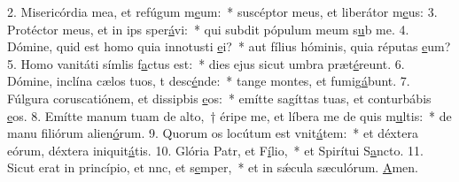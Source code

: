 2. Misericórdia mea, et refúgum m\uline{e}um:~* suscéptor meus, et liberátor m\uline{e}us:
3. Protéctor meus, et in ips sper\uline{á}vi:~* qui subdit pópulum meum s\uline{u}b me.
4. Dómine, quid est homo quia innotusti \uline{e}i?~* aut fílius hóminis, quia réputas \uline{e}um?
5. Homo vanitáti símlis f\uline{a}ctus est:~* dies ejus sicut umbra præt\uline{é}reunt.
6. Dómine, inclína cælos tuos, t desc\uline{é}nde:~* tange montes, et fumig\uline{á}bunt.
7. Fúlgura coruscatiónem, et dissipbis \uline{e}os:~* emítte sagíttas tuas, et conturbábis \uline{e}os.
8. Emítte manum tuam de alto,~† éripe me, et líbera me de quis m\uline{u}ltis:~* de manu filiórum alien\uline{ó}rum.
9. Quorum os locútum est vnit\uline{á}tem:~* et déxtera eórum, déxtera iniquit\uline{á}tis.
10. Glória Patr, et F\uline{í}lio,~* et Spirítui S\uline{a}ncto.
11. Sicut erat in princípio, et nnc, et s\uline{e}mper,~* et in sǽcula sæculórum. \uline{A}men.
